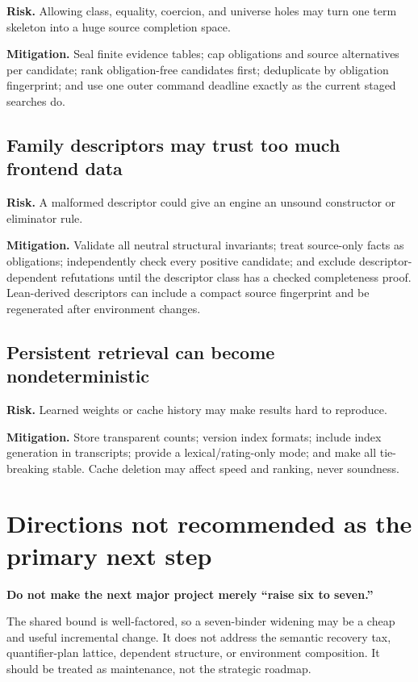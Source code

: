 \documentclass[11pt]{article}
\newenvironment{caution}[1]
{\par\medskip\noindent\colorbox{WarnBg}{\parbox{\dimexpr\linewidth-2\fboxsep\relax}{\sffamily\bfseries #1}}\par\smallskip}
{\par\medskip}
\begin{document}
\textbf{Risk.}  Allowing class, equality, coercion, and universe holes may turn
one term skeleton into a huge source completion space.

\textbf{Mitigation.}  Seal finite evidence tables; cap obligations and source
alternatives per candidate; rank obligation-free candidates first; deduplicate
by obligation fingerprint; and use one outer command deadline exactly as the
current staged searches do.

\subsection{Family descriptors may trust too much frontend data}

\textbf{Risk.}  A malformed descriptor could give an engine an unsound
constructor or eliminator rule.

\textbf{Mitigation.}  Validate all neutral structural invariants; treat
source-only facts as obligations; independently check every positive candidate;
and exclude descriptor-dependent refutations until the descriptor class has a
checked completeness proof.  Lean-derived descriptors can include a compact
source fingerprint and be regenerated after environment changes.

\subsection{Persistent retrieval can become nondeterministic}

\textbf{Risk.}  Learned weights or cache history may make results hard to
reproduce.

\textbf{Mitigation.}  Store transparent counts; version index formats; include
index generation in transcripts; provide a lexical/rating-only mode; and make
all tie-breaking stable.  Cache deletion may affect speed and ranking, never
soundness.

\section{Directions not recommended as the primary next step}
\label{sec:not-recommended}

\begin{caution}{Do not make the next major project merely ``raise six to seven.''}
The shared bound is well-factored, so a seven-binder widening may be a cheap and
useful incremental change.  It does not address the semantic recovery tax,
quantifier-plan lattice, dependent structure, or environment composition.  It
should be treated as maintenance, not the strategic roadmap.
\end{caution}
\end{document}
